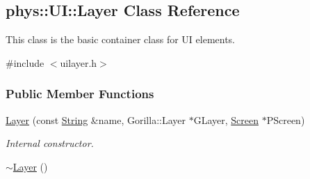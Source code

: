 \hypertarget{classphys_1_1UI_1_1Layer}{
\subsection{phys::UI::Layer Class Reference}
\label{classphys_1_1UI_1_1Layer}
}


This class is the basic container class for UI elements.  




{\ttfamily \#include $<$uilayer.h$>$}

\subsubsection*{Public Member Functions}
\begin{DoxyCompactItemize}
\item 
\hyperlink{classphys_1_1UI_1_1Layer_a26fd46d043fa1786a543b4c6b3863643}{Layer} (const \hyperlink{namespacephys_aa03900411993de7fbfec4789bc1d392e}{String} \&name, Gorilla::Layer $\ast$GLayer, \hyperlink{classphys_1_1UI_1_1Screen}{Screen} $\ast$PScreen)
\begin{DoxyCompactList}\small\item\em Internal constructor. \item\end{DoxyCompactList}\item 
\hypertarget{classphys_1_1UI_1_1Layer_a02f12501f3efbb5b06d59bfc04fab50d}{
\hyperlink{classphys_1_1UI_1_1Layer_a02f12501f3efbb5b06d59bfc04fab50d}{$\sim$Layer} ()}
\label{classphys_1_1UI_1_1Layer_a02f12501f3efbb5b06d59bfc04fab50d}


\end{DoxyCompactItemize}
